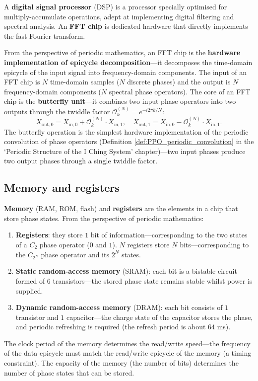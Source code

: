 \begin{definition}\label{def:dsp_fft}
A \textbf{digital signal processor} (DSP) is a processor specially optimised for multiply-accumulate operations, adept at implementing digital filtering and spectral analysis. An \textbf{FFT chip} is dedicated hardware that directly implements the fast Fourier transform.

From the perspective of periodic mathematics, an FFT chip is the \textbf{hardware implementation of epicycle decomposition}---it decomposes the time-domain epicycle of the input signal into frequency-domain components. The input of an FFT chip is $N$ time-domain samples ($N$ discrete phases) and the output is $N$ frequency-domain components ($N$ spectral phase operators). The core of an FFT chip is the \textbf{butterfly unit}---it combines two input phase operators into two outputs through the twiddle factor $\mathcal{O}_k^{(N)} = e^{-i2\pi k/N}$:
\[
X_{\text{out},0} = X_{\text{in},0} + \mathcal{O}_k^{(N)} \cdot X_{\text{in},1}, \quad X_{\text{out},1} = X_{\text{in},0} - \mathcal{O}_k^{(N)} \cdot X_{\text{in},1}.
\]
The butterfly operation is the simplest hardware implementation of the periodic convolution of phase operators (Definition \ref{def:PPO_periodic_convolution} in the `Periodic Structure of the I Ching System' chapter)---two input phases produce two output phases through a single twiddle factor.
\end{definition}

\subsection{Memory and registers}

\begin{definition}\label{def:memory_epicycle}
\textbf{Memory} (RAM, ROM, flash) and \textbf{registers} are the elements in a chip that store phase states. From the perspective of periodic mathematics:
\begin{enumerate}[label=(\roman*)]
    \item \textbf{Registers}: they store $1$ bit of information---corresponding to the two states of a $C_2$ phase operator ($0$ and $1$). $N$ registers store $N$ bits---corresponding to the $C_{2^N}$ phase operator and its $2^N$ states.
    \item \textbf{Static random-access memory} (SRAM): each bit is a bistable circuit formed of $6$ transistors---the stored phase state remains stable whilst power is supplied.
    \item \textbf{Dynamic random-access memory} (DRAM): each bit consists of $1$ transistor and $1$ capacitor---the charge state of the capacitor stores the phase, and periodic refreshing is required (the refresh period is about $64$ ms).
\end{enumerate}
The clock period of the memory determines the read/write speed---the frequency of the data epicycle must match the read/write epicycle of the memory (a timing constraint). The capacity of the memory (the number of bits) determines the number of phase states that can be stored.
\end{definition}

